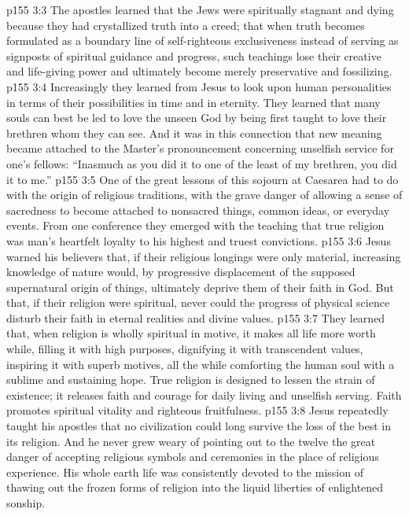 \vs p155 3:3 The apostles learned that the Jews were spiritually stagnant and dying because they had crystallized truth into a creed; that when truth becomes formulated as a boundary line of self\hyp{}righteous exclusiveness instead of serving as signposts of spiritual guidance and progress, such teachings lose their creative and life\hyp{}giving power and ultimately become merely preservative and fossilizing.
\vs p155 3:4 Increasingly they learned from Jesus to look upon human personalities in terms of their possibilities in time and in eternity. They learned that many souls can best be led to love the unseen God by being first taught to love their brethren whom they can see. And it was in this connection that new meaning became attached to the Master’s pronouncement concerning unselfish service for one’s fellows: \textcolor{ubdarkred}{“Inasmuch as you did it to one of the least of my brethren, you did it to me.”}
\vs p155 3:5 One of the great lessons of this sojourn at Caesarea had to do with the origin of religious traditions, with the grave danger of allowing a sense of sacredness to become attached to nonsacred things, common ideas, or everyday events. From one conference they emerged with the teaching that true religion was man’s heartfelt loyalty to his highest and truest convictions.
\vs p155 3:6 Jesus warned his believers that, if their religious longings were only material, increasing knowledge of nature would, by progressive displacement of the supposed supernatural origin of things, ultimately deprive them of their faith in God. But that, if their religion were spiritual, never could the progress of physical science disturb their faith in eternal realities and divine values.
\vs p155 3:7 They learned that, when religion is wholly spiritual in motive, it makes all life more worth while, filling it with high purposes, dignifying it with transcendent values, inspiring it with superb motives, all the while comforting the human soul with a sublime and sustaining hope. True religion is designed to lessen the strain of existence; it releases faith and courage for daily living and unselfish serving. Faith promotes spiritual vitality and righteous fruitfulness.
\vs p155 3:8 Jesus repeatedly taught his apostles that no civilization could long survive the loss of the best in its religion. And he never grew weary of pointing out to the twelve the great danger of accepting religious symbols and ceremonies in the place of religious experience. His whole earth life was consistently devoted to the mission of thawing out the frozen forms of religion into the liquid liberties of enlightened sonship.
